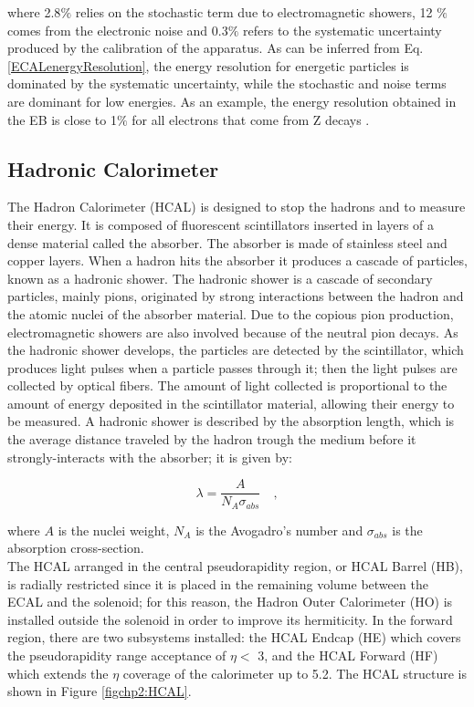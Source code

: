 where 2.8$\%$ relies on the stochastic term due to electromagnetic showers, 12 $\%$ comes from the 
electronic noise and 0.3$\%$ refers to the systematic uncertainty produced by the calibration of the apparatus. As can be inferred from
Eq. \ref{ECALenergyResolution}, the energy resolution for energetic particles is dominated by the systematic uncertainty, while
the stochastic and noise terms are dominant for low energies. As an example, the energy resolution 
obtained in the EB is close to 1$\%$ for all electrons that come from Z decays \cite{ECALperformance}.

\subsection{Hadronic Calorimeter}
\label{subsec:HCal}

The Hadron Calorimeter (HCAL) is designed to stop the hadrons and to measure 
their energy. It is composed of fluorescent scintillators inserted in layers of 
a dense material called the absorber. The absorber is made of stainless 
steel and copper layers. When a hadron hits the absorber it produces a cascade of 
particles, known as a hadronic shower. The hadronic shower is a cascade of 
secondary particles, mainly pions, originated by strong interactions between 
the hadron and the atomic nuclei of the absorber material.  Due to the copious pion
production, electromagnetic showers are also involved because of the 
neutral pion decays. As the hadronic shower develops, the particles are detected by the scintillator, which
 produces light pulses when a particle passes through it; then the light pulses are 
 collected by optical fibers. The amount of light collected is proportional to the amount 
 of energy deposited in the scintillator material, allowing their energy to be measured. A hadronic 
 shower is described by the absorption length, which is the average distance traveled by the 
 hadron trough the medium before it strongly-interacts with the absorber; it is given by:

 \begin{equation}
 \lambda = \frac{A}{N_{A} \sigma_{abs}} \quad,
\end{equation}

where $A$ is the nuclei weight, $N_{A}$ is the Avogadro's number and $\sigma_{abs}$
is the absorption cross-section.\\

The HCAL arranged in the central pseudorapidity region, or 
HCAL Barrel (HB), is radially restricted since it is placed in the remaining volume
between the ECAL and the solenoid; for this reason, the Hadron Outer Calorimeter (HO) is 
installed outside the solenoid in order to improve its hermiticity. In the 
forward region, there are two subsystems installed: the HCAL Endcap (HE) 
which covers the pseudorapidity range acceptance of $\eta <$ 3, and the HCAL 
Forward (HF) which extends the $\eta$ coverage of the calorimeter up to 5.2. The HCAL structure 
is shown in Figure \ref{figchp2:HCAL}.

